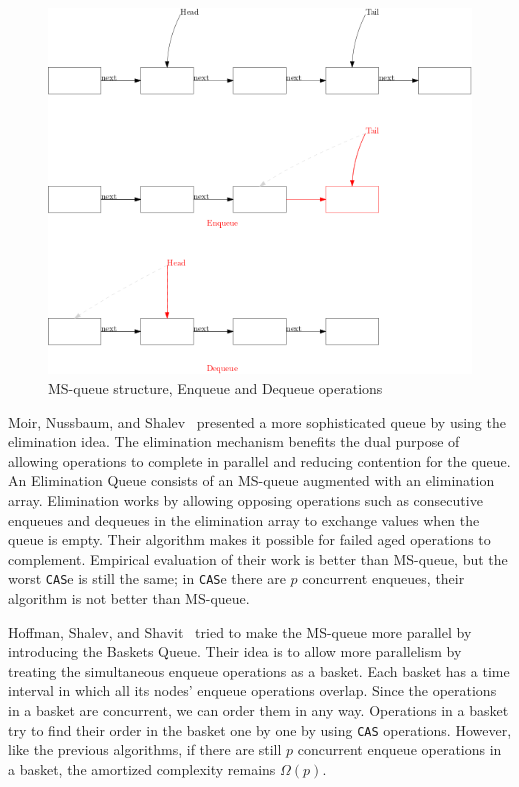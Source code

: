 \documentclass[12pt]{article}
\begin{document}
\begin{figure}[hbt]
  \center\includegraphics[scale=0.5]{pics/msqueue}
  \caption{MS-queue structure, Enqueue and Dequeue operations}
\end{figure}


Moir, Nussbaum, and Shalev~\cite{DBLP:conf/spaa/MoirNSS05} presented a more sophisticated queue by using the elimination idea. The elimination mechanism benefits the dual purpose of allowing operations to complete in parallel and reducing contention for the queue. An Elimination Queue consists of an MS-queue augmented with an elimination array. Elimination works by allowing opposing operations such as consecutive enqueues and dequeues  in the elimination array to exchange values when the queue is empty. Their algorithm makes it possible for failed aged operations to complement. Empirical evaluation of their work is better than MS-queue, but the worst \texttt{CAS}e is still the same; in \texttt{CAS}e there are $p$ concurrent enqueues, their algorithm is not better than MS-queue. 


Hoffman, Shalev, and Shavit~\cite{DBLP:conf/opodis/HoffmanSS07} tried to make the MS-queue more parallel by introducing the Baskets Queue. Their idea is to allow more parallelism by treating the simultaneous enqueue operations as a basket. Each basket has a time interval in which all its nodes’ enqueue operations overlap. Since the operations in a basket are concurrent, we can order them in any way. Operations in a basket try to find their order in the basket one by one by using \texttt{CAS} operations. However, like the previous algorithms, if there are still $p$ concurrent enqueue operations in a basket, the amortized complexity remains $\Omega(p)$.
\end{document}
